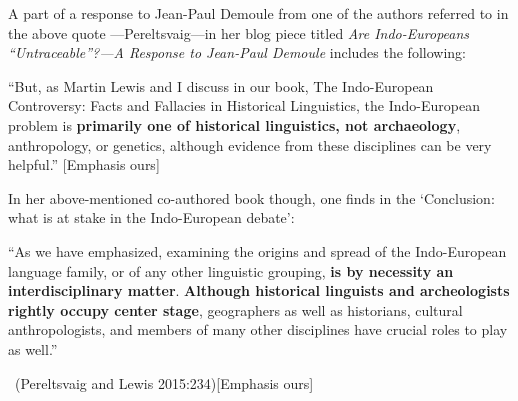 A part of a response to Jean-Paul Demoule from one of the authors referred to in the above quote —Pereltsvaig—in her blog piece titled \textit{Are Indo-Europeans “Untraceable”?—A Response to Jean-Paul Demoule} includes the following:

\begin{myquote}
“But, as Martin Lewis and I discuss in our book, The Indo-European Controversy: Facts and Fallacies in Historical Linguistics, the Indo-European problem is \textbf{primarily one of historical linguistics, not archaeology}, anthropology, or genetics, although evidence from these disciplines can be very helpful.” [Emphasis ours]
\end{myquote}

In her above-mentioned co-authored book though, one finds in the ‘Conclusion: what is at stake in the Indo-European debate’:

\begin{myquote}
“As we have emphasized, examining the origins and spread of the Indo-European language family, or of any other linguistic grouping, \textbf{is by necessity an interdisciplinary matter}. \textbf{Although historical linguists and archeologists rightly occupy center stage}, geographers as well as historians, cultural anthropologists, and members of many other disciplines have crucial roles to play as well.”

~\hfill (Pereltsvaig and Lewis 2015:234)[Emphasis ours]
\end{myquote}

